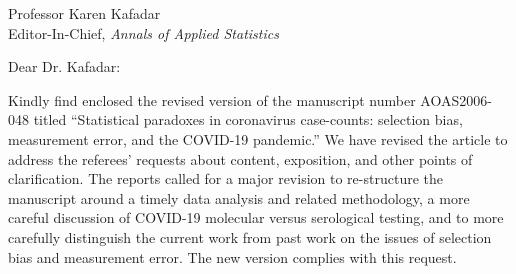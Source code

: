 \documentclass[10pt]{letter} %
\begin{document}

\begin{letter}{Professor Karen Kafadar \\
    Editor-In-Chief, {\em Annals of Applied Statistics}
         }


\signature{Walter Dempsey\\
University of Michigan \\
Department of Biostatistics\\
M4057 SPH II \\
1415 Washington Heights \\
wdem@umich.edu} %


\date\today

\opening{Dear Dr. Kafadar:}

Kindly find enclosed the revised version of the manuscript number AOAS2006-048 titled ``Statistical paradoxes in coronavirus case-counts: selection bias, measurement error, and the COVID-19 pandemic.''  We have revised the article to address the referees’ requests about content, exposition, and other points of clarification.  The reports called for a major revision to re-structure the manuscript around a timely data analysis and related methodology, a more careful discussion of COVID-19 molecular versus serological testing, and to more carefully distinguish the current work from past work on the issues of selection bias and measurement error. The new version complies with this request.


\end{letter}
\end{document}
